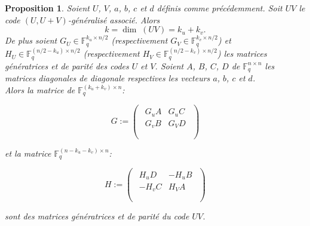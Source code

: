 \documentclass[12pt]{article}
\theoremstyle{plain}
\newtheorem{propo}[thm]{Proposition}
\newcommand{\F}{\mathbb{F}}
\begin{document}
\begin{propo} Soient $U$, $V$, $a$, $b$, $c$ et $d$ définis comme précédemment. Soit $UV$ le code $(U,U+V)$-généralisé associé. Alors
$$ k = \dim\; (UV) = k_u + k_v.$$
De plus soient $G_U \in \F_q^{k_u \times n/2}$ (respectivement $G_V \in \F_q^{k_v \times n/2}$) et $H_U \in \F_q^{(n/2-k_u) \times n/2}$ (respectivement $H_V \in \F_q^{(n/2-k_v) \times n/2}$) les matrices génératrices et de parité des codes $U$ et $V$. Soient $A$, $B$, $C$, $D$ de $\F_q^{n \times n}$ les matrices diagonales de diagonale respectives les vecteurs $a$, $b$, $c$ et $d$.  \\
\vspace{0.2in}
Alors la matrice de $\F_q^{(k_u + k_v) \times n}$: 

\vspace{0.1in}

$$
G := 
\begin{pmatrix}
\begin{array}{c|c}
G_uA & G_uC \\
 \hline 
G_vB & G_VD \\
\end{array} \\
\end{pmatrix}
$$

\noindent et la matrice $\F_q^{(n - k_u - k_v) \times n}$:

\vspace{0.1in}
$$ 
H :=
\begin{pmatrix}
\begin{array}{c|c}
H_uD & -H_uB \\
 \hline 
-H_vC & H_VA \\
\end{array} \\
\end{pmatrix}
$$
\vspace{0.1in}

\noindent sont des matrices génératrices et de parité du code $UV$. 
\end{propo}
\end{document}
